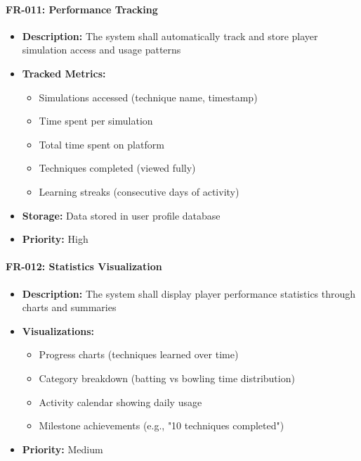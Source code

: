 \documentclass[12pt,a4paper]{article}
\begin{document}
\begin{enumerate}
\paragraph{FR-011: Performance Tracking}
\begin{itemize}
    \item \textbf{Description:} The system shall automatically track and store player simulation access and usage patterns
    \item \textbf{Tracked Metrics:}
    \begin{itemize}
        \item Simulations accessed (technique name, timestamp)
        \item Time spent per simulation
        \item Total time spent on platform
        \item Techniques completed (viewed fully)
        \item Learning streaks (consecutive days of activity)
    \end{itemize}
    \item \textbf{Storage:} Data stored in user profile database
    \item \textbf{Priority:} High
\end{itemize}

\paragraph{FR-012: Statistics Visualization}
\begin{itemize}
    \item \textbf{Description:} The system shall display player performance statistics through charts and summaries
    \item \textbf{Visualizations:}
    \begin{itemize}
        \item Progress charts (techniques learned over time)
        \item Category breakdown (batting vs bowling time distribution)
        \item Activity calendar showing daily usage
        \item Milestone achievements (e.g., "10 techniques completed")
    \end{itemize}
    \item \textbf{Priority:} Medium
\end{itemize}


\end{enumerate}
\end{document}
